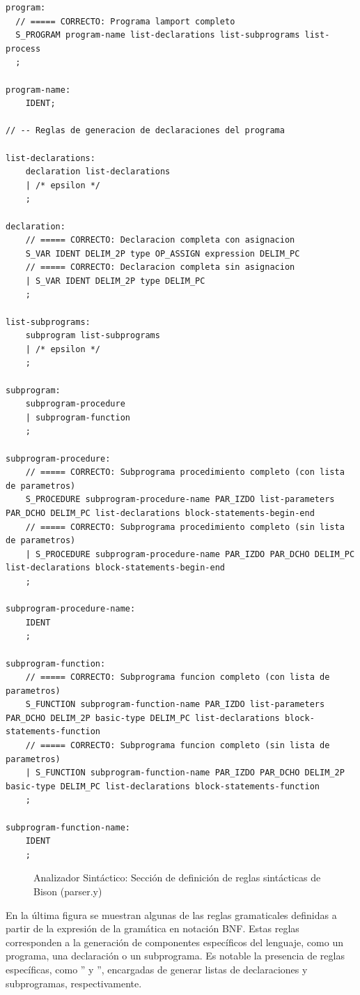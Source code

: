 \begin{lstlisting}[style=customflex]
program:
  // ===== CORRECTO: Programa lamport completo
  S_PROGRAM program-name list-declarations list-subprograms list-process
  ;

program-name:
    IDENT;

// -- Reglas de generacion de declaraciones del programa

list-declarations:
    declaration list-declarations
    | /* epsilon */
    ;

declaration:
    // ===== CORRECTO: Declaracion completa con asignacion
    S_VAR IDENT DELIM_2P type OP_ASSIGN expression DELIM_PC
    // ===== CORRECTO: Declaracion completa sin asignacion
    | S_VAR IDENT DELIM_2P type DELIM_PC
    ;

list-subprograms:
    subprogram list-subprograms
    | /* epsilon */
    ;

subprogram:
    subprogram-procedure
    | subprogram-function
    ;

subprogram-procedure:
    // ===== CORRECTO: Subprograma procedimiento completo (con lista de parametros)
    S_PROCEDURE subprogram-procedure-name PAR_IZDO list-parameters PAR_DCHO DELIM_PC list-declarations block-statements-begin-end
    // ===== CORRECTO: Subprograma procedimiento completo (sin lista de parametros)
    | S_PROCEDURE subprogram-procedure-name PAR_IZDO PAR_DCHO DELIM_PC list-declarations block-statements-begin-end
    ;

subprogram-procedure-name:
    IDENT
    ;

subprogram-function:
    // ===== CORRECTO: Subprograma funcion completo (con lista de parametros)
    S_FUNCTION subprogram-function-name PAR_IZDO list-parameters PAR_DCHO DELIM_2P basic-type DELIM_PC list-declarations block-statements-function
    // ===== CORRECTO: Subprograma funcion completo (sin lista de parametros)
    | S_FUNCTION subprogram-function-name PAR_IZDO PAR_DCHO DELIM_2P basic-type DELIM_PC list-declarations block-statements-function
    ;

subprogram-function-name:
    IDENT
    ;

\end{lstlisting}
\begin{figure}[h]
\caption{Analizador Sintáctico: Sección de definición de reglas sintácticas de Bison (parser.y)}
\label{fig:bisonRules}
\end{figure}

En la última figura se muestran algunas de las reglas gramaticales definidas a partir de la expresión de la gramática en notación BNF. Estas reglas corresponden a la generación de componentes específicos del lenguaje, como un programa, una declaración o un subprograma. Es notable la presencia de reglas específicas, como '' y '', encargadas de generar listas de declaraciones y subprogramas, respectivamente.

